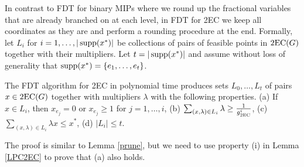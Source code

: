 In contrast to FDT for binary MIPs where we round up the fractional variables that are already branched on at each level, in FDT for 2EC we keep all coordinates as they are and perform a rounding procedure at the end. Formally, let $L_i$ for $i=1,\ldots,|\operatorname{supp}(x^*)|$ be collections of pairs of feasible points in $\operatorname{2EC}(G)$ together with their multipliers. Let $t=|\operatorname{supp}(x^*)|$ and assume without loss of generality that $\operatorname{supp}(x^*)=\{e_1,\ldots,e_t\}$. 

\begin{lemma}\label{2ecpruning}
	The FDT algorithm for 2EC in  polynomial time produces sets $L_0,\ldots,L_t$ of pairs $x\in \operatorname{2EC}(G)$ together with multipliers $\lambda$ with the following properties.
		(a) If $x\in L_i$, then $x_{e_j}=0$ or $x_{e_j}\geq 1$ for $j=1,\ldots,i$, (b) $\sum_{(x,\lambda)\in L_i }\lambda \geq \frac{1}{g_{\operatorname{2EC}}^i}$, (c) $\sum_{(x,\lambda)\in L_i }\lambda x \leq x^*$, (d) $|L_i|\leq t$.
\end{lemma}
The proof is similar to Lemma \ref{prune}, but we need to use property (i) in Lemma \ref{LPC2EC} to prove that (a) also holds.
\iffalse{
\begin{proof}
	We proceed by induction on the $i$. Define $L_0=\{(x^*,1)\}$. It is easy to check all the properties are satisfied. Now, suppose by induction we have $L_{i-1}$ for some $i=1,\ldots,t$ that satisfies all the properties. For each solution $x^\ell$ in $L_{i-1}$ apply Lemma \ref{LPC2EC} on $x^\ell$ and $e_{i}$ to obtain $x^{\ell j}$ and $\lambda_{\ell j}$ for $j=0,1,2$. Let $L'$ be the collection that contains $(x^{\ell j},\lambda_\ell \cdot \lambda_{\ell j})$ for $j=0,1,2$, when applied to all $(x^\ell,\lambda_\ell)$ in $L_{i-1}$. Similar to the proof in Lemma \ref{prune} one can check that $L_i$ satisfies properties (b), (c). We now verify property (a). Consider a solution $x^\ell$ in $L_{i-1}$. For $e\in \{e_1,\ldots,e_{i-1}\}$ if $x^\ell_e =0$, then by property (iv) in Lemma \ref{LPC2EC} we have $x^{\ell j}=0$ for $j=0,1,2$. Otherwise by induction we have $x^{\ell}_{e}\geq 1$ in which case property (v) in Lemma \ref{LPC2EC} ensures that $x^{\ell j}_e\geq 1$ for $j=0,1,2$. Also, $x^{\ell j}_{e_i}= j$, so $x^{\ell j}_{e_i}=0$ or $x^{\ell j}_{e_i}\geq 1$ for $j=0,1,2$. 
	
	If $|L'|\geq t$ we let $L_i=L'$, otherwise apply $\prun(L')$ to obtain $L_{i}$.
\end{proof}	}\fi

